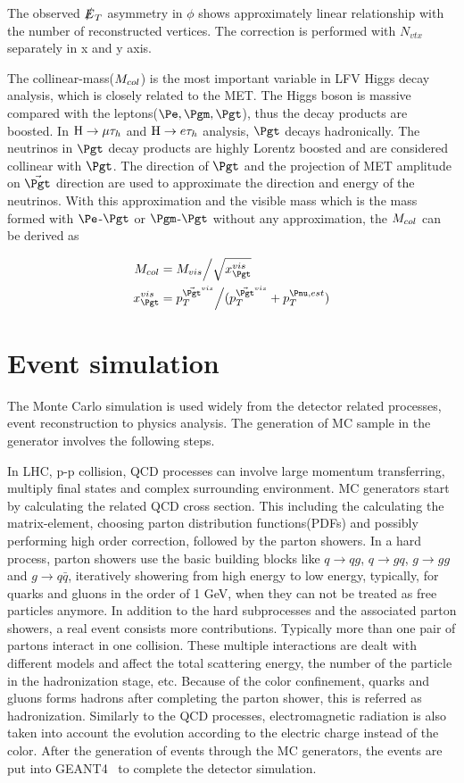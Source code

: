 The observed $\slashed{E}_{T}$ asymmetry in $\phi$ shows approximately linear relationship with the number of reconstructed vertices. The correction is performed with $N_{vtx}$ separately in x and y axis. 

The collinear-mass($M_{col}$) is the most important variable in LFV Higgs decay analysis, which is closely related to the MET. The Higgs boson is massive compared with the leptons($\Pe,\Pgm,\Pgt$), thus the decay products are boosted. In $\mathrm{H}\to \mu\tau_{h}$ and $\mathrm{H} \to e \tau_{h}$ analysis, $\Pgt$ decays hadronically. The neutrinos in $\Pgt$ decay products are highly Lorentz boosted and are considered collinear with $\Pgt$. The direction of $\Pgt$ and the projection of MET amplitude on $\vec{\Pgt}$ direction are used to approximate the direction and energy of the neutrinos. With this approximation and the visible mass which is the mass formed with $\Pe$-$\Pgt$ or $\Pgm$-$\Pgt$ without any approximation, the $M_{col}$ can be derived as

\begin{align*}
\mcol&=M_{vis}\Big/\sqrt{x^{vis}_{\Pgt}}\\
x^{vis}_{\Pgt}&=p_{T}^{\vec{\Pgt}^{vis}}\Big/(p_{T}^{\vec{\Pgt}^{vis}}+p_{T}^{\Pnu,est})
\end{align*}

\section{Event simulation}
The Monte Carlo simulation is used widely from the detector related processes, event reconstruction to physics analysis. The generation of MC sample in the generator involves the following steps. 

In LHC, p-p collision, QCD processes can involve large momentum transferring, multiply final states and complex surrounding environment. MC generators start by calculating the related QCD cross section. This including the calculating the matrix-element, choosing parton distribution functions(PDFs) and possibly performing high order correction, followed by the parton showers. In a hard process, parton showers use the basic building blocks like $q\rightarrow qg$, $q\rightarrow gq$, $g\rightarrow gg$ and $g\rightarrow q\bar{q}$, iteratively showering from high energy to low energy, typically, for quarks and gluons in the order of 1 GeV, when they can not be treated as free particles anymore. In addition to the hard subprocesses and the associated parton showers, a real event consists more contributions. Typically more than one pair of partons interact in one collision. These multiple interactions are dealt with different models and affect the total scattering energy, the number of the particle in the hadronization stage, etc. Because of the color confinement, quarks and gluons forms hadrons after completing the parton shower, this is referred as hadronization. Similarly to the QCD processes, electromagnetic radiation is also taken into account the evolution according to the electric charge instead of the color. After the generation of events through the MC generators, the events are put into GEANT4~\cite{GEANT4} to complete the detector simulation.


